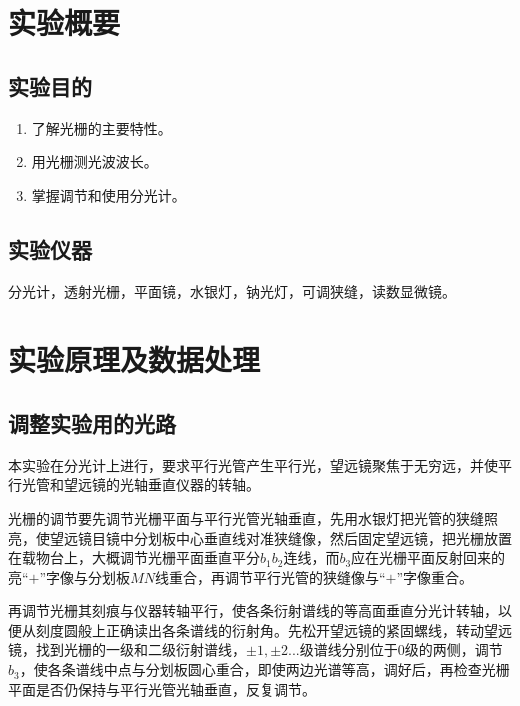 \documentclass[a4paper]{article}
\begin{document}


\begin{changemargin}{1cm}{1cm}
    \section{实验概要}
    \subsection{实验目的}
    \begin{enumerate}
        \item 了解光栅的主要特性。
        \item 用光栅测光波波长。
        \item 掌握调节和使用分光计。
    \end{enumerate}
    \subsection{实验仪器}
    分光计，透射光栅，平面镜，水银灯，钠光灯，可调狭缝，读数显微镜。

    \section{实验原理及数据处理}
    \subsection{调整实验用的光路}
    \begin{spacing}{1.6}
        本实验在分光计上进行，要求平行光管产生平行光，望远镜聚焦于无穷远，并使平行光管和望远镜的光轴垂直仪器的转轴。\par

        光栅的调节要先调节光栅平面与平行光管光轴垂直，先用水银灯把光管的狭缝照亮，使望远镜目镜中分划板中心垂直线对准狭缝像，然后固定望远镜，把光栅放置在载物台上，大概调节光栅平面垂直平分$b_1b_2$连线，而$b_3$应在光栅平面反射回来的亮“$+$”字像与分划板$MN$线重合，再调节平行光管的狭缝像与“$+$”字像重合。\par

        再调节光栅其刻痕与仪器转轴平行，使各条衍射谱线的等高面垂直分光计转轴，以便从刻度圆般上正确读出各条谱线的衍射角。先松开望远镜的紧固螺线，转动望远镜，找到光栅的一级和二级衍射谱线，$\pm1,\pm2...$级谱线分别位于0级的两侧，调节$b_3$，使各条谱线中点与分划板圆心重合，即使两边光谱等高，调好后，再检查光栅平面是否仍保持与平行光管光轴垂直，反复调节。\par
    \end{spacing}


\end{changemargin}
\end{document}
